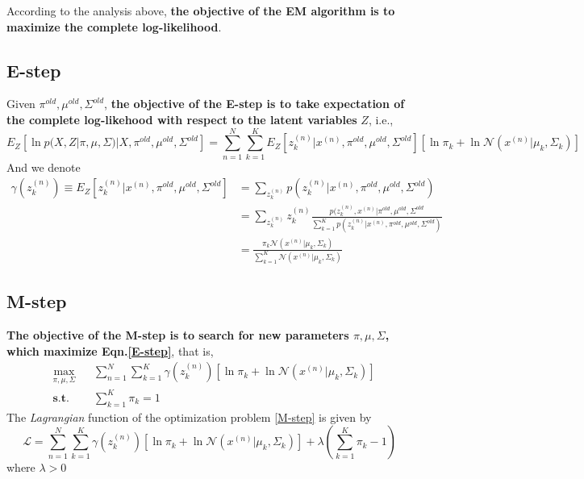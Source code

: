 \documentclass{article}
\begin{document}
\begin{spacing}{1.5}
According to the analysis above, \textbf{the objective of the EM algorithm is to maximize the complete log-likelihood}.

\subsection{E-step}
Given $\pi^{old}, \mu^{old}, \Sigma^{old}$, \textbf{the objective of the E-step is to take expectation of the complete log-likehood with respect to the latent variables} $Z$, i.e.,
\begin{equation}
E_Z [\ln p(X,Z|\pi,\mu,\Sigma)|X,\pi^{old}, \mu^{old}, \Sigma^{old}] = \sum_{n=1}^N \sum_{k=1}^K E_Z[z^{(n)}_k|x^{(n)}, \pi^{old}, \mu^{old}, \Sigma^{old}][\ln \pi_k + \ln \mathcal{N}(x^{(n)}|\mu_k, \Sigma_k)]
\label{E-step}
\end{equation}
And we denote
\begin{equation}
\begin{aligned}
\gamma(z^{(n)}_k)\equiv E_Z[z^{(n)}_k|x^{(n)}, \pi^{old}, \mu^{old}, \Sigma^{old}] &= \sum_{z^{(n)}_k} p(z^{(n)}_k|x^{(n)}, \pi^{old}, \mu^{old}, \Sigma^{old}) \\
&=\sum_{z^{(n)}_k}z^{(n)}_k \frac{p(z^{(n)}_k, x^{(n)}| \pi^{old}, \mu^{old}, \Sigma^{old}}{\sum_{k=1}^K p(z^{(n)}_k|x^{(n)}, \pi^{old}, \mu^{old}, \Sigma^{old})} \\
&= \frac{\pi_k \mathcal{N}(x^{(n)}|\mu_k, \Sigma_k)}{\sum_{k=1}^K \mathcal{N}(x^{(n)}|\mu_k, \Sigma_k)}
\end{aligned}
\end{equation}

\subsection{M-step}
\textbf{The objective of the M-step is to search for new parameters $\pi, \mu, \Sigma$, which maximize Eqn.\ref{E-step}}, that is, 
\begin{equation}
\begin{aligned}
& \underset{\pi, \mu, \Sigma}{\text{max}} 
& &\sum_{n=1}^N \sum_{k=1}^K \gamma(z^{(n)}_k)[\ln \pi_k + \ln \mathcal{N}(x^{(n)}|\mu_k, \Sigma_k)] \\
& \textbf{s.t.} & & \sum_{k=1}^K \pi_k = 1
\end{aligned}
\label{M-step}
\end{equation}
The \textit{Lagrangian} function of the optimization problem \ref{M-step} is given by
\begin{equation}
\mathcal{L} = \sum_{n=1}^N \sum_{k=1}^K \gamma(z^{(n)}_k)[\ln \pi_k + \ln \mathcal{N}(x^{(n)}|\mu_k, \Sigma_k)] + \lambda (\sum_{k=1}^K \pi_k - 1)
\end{equation}
where $\lambda > 0$

\end{spacing}
\end{document}
